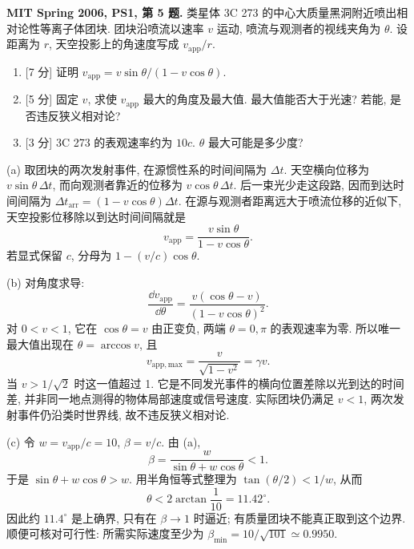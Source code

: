 \begin{exercise}
\textbf{MIT Spring 2006, PS1, 第 5 题.} 类星体 3C 273 的中心大质量黑洞附近喷出相对论性等离子体团块. 团块沿喷流以速率 $v$ 运动, 喷流与观测者的视线夹角为 $\theta$. 设距离为 $r$, 天空投影上的角速度写成 $v_{\mathrm{app}}/r$.
\begin{enumerate}[label=(\alph*)]
\item \textnormal{[7 分]} 证明 $v_{\mathrm{app}}=v\sin\theta/(1-v\cos\theta)$.
\item \textnormal{[5 分]} 固定 $v$, 求使 $v_{\mathrm{app}}$ 最大的角度及最大值. 最大值能否大于光速? 若能, 是否违反狭义相对论?
\item \textnormal{[3 分]} 3C 273 的表观速率约为 $10c$. $\theta$ 最大可能是多少度?
\end{enumerate}
\end{exercise}
\begin{solution}
(a) 取团块的两次发射事件, 在源惯性系的时间间隔为 $\Delta t$. 天空横向位移为 $v\sin\theta\,\Delta t$, 而向观测者靠近的位移为 $v\cos\theta\,\Delta t$. 后一束光少走这段路, 因而到达时间间隔为 $\Delta t_{\mathrm{arr}}=(1-v\cos\theta)\Delta t$. 在源与观测者距离远大于喷流位移的近似下, 天空投影位移除以到达时间间隔就是
\[
 v_{\mathrm{app}}=\frac{v\sin\theta}{1-v\cos\theta}.
\]
若显式保留 $c$, 分母为 $1-(v/c)\cos\theta$.

(b) 对角度求导:
\[
 \frac{\dd v_{\mathrm{app}}}{\dd\theta}
 =\frac{v(\cos\theta-v)}{(1-v\cos\theta)^2}.
\]
对 $0<v<1$, 它在 $\cos\theta=v$ 由正变负, 两端 $\theta=0,\pi$ 的表观速率为零. 所以唯一最大值出现在 $\theta=\arccos v$, 且
\[
 v_{\mathrm{app,max}}=\frac{v}{\sqrt{1-v^2}}=\gamma v.
\]
当 $v>1/\sqrt2$ 时这一值超过 1. 它是不同发光事件的横向位置差除以光到达的时间差, 并非同一地点测得的物体局部速度或信号速度. 实际团块仍满足 $v<1$, 两次发射事件仍沿类时世界线, 故不违反狭义相对论.

(c) 令 $w=v_{\mathrm{app}}/c=10$, $\beta=v/c$. 由 (a),
\[
 \beta=\frac{w}{\sin\theta+w\cos\theta}<1.
\]
于是 $\sin\theta+w\cos\theta>w$. 用半角恒等式整理为 $\tan(\theta/2)<1/w$, 从而
\[
 \theta<2\arctan\frac1{10}=11.42^\circ.
\]
因此约 $11.4^\circ$ 是上确界, 只有在 $\beta\to1$ 时逼近; 有质量团块不能真正取到这个边界. 顺便可核对可行性: 所需实际速度至少为 $\beta_{\min}=10/\sqrt{101}\simeq0.9950$.
\end{solution}

